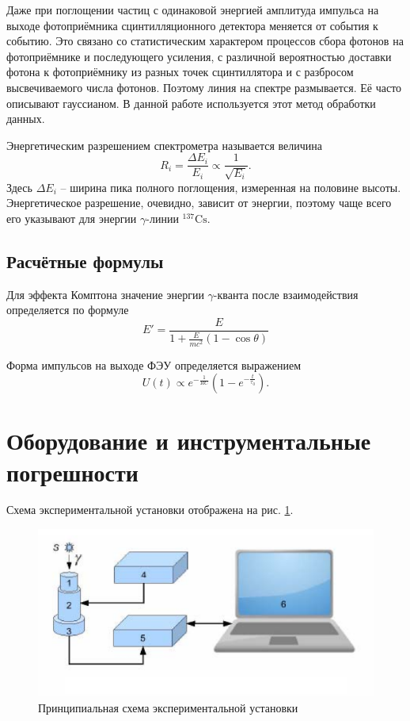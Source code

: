 \documentclass[a4paper]{article}
\newcommand{\isotope}[2]{$ ^{#2}\mathrm{#1} $}
\newcommand{\gmm}{$\gamma $}
\begin{document}
Даже при поглощении частиц с одинаковой энергией амплитуда импульса на выходе фотоприёмника сцинтилляционного детектора меняется от события к событию. Это связано со статистическим характером процессов сбора фотонов на фотоприёмнике и последующего усиления, с различной вероятностью доставки фотона к фотоприёмнику из разных точек сцинтиллятора и с разбросом высвечиваемого числа фотонов. Поэтому линия на спектре размывается. Её часто описывают гауссианом. В данной работе используется этот метод обработки данных. 

Энергетическим разрешением спектрометра называется величина
\begin{equation}
	R_i = \dfrac{\Delta E_i}{E_i} \propto \dfrac{1}{\sqrt{E_i}}.
\end{equation}
Здесь $ \Delta E_i $ -- ширина пика полного поглощения, измеренная на половине высоты. Энергетическое разрешение, очевидно, зависит от энергии, поэтому чаще всего его указывают для энергии \gmm-линии \isotope{Cs}{137}.

\subsection{Расчётные формулы}

Для эффекта Комптона значение энергии \gmm-кванта после взаимодействия определяется по формуле
\begin{equation*}\label{ы}
	E' = \frac{E}{1+\frac{E}{m c^2}\left( 1- \cos \theta\right) }
\end{equation*}

Форма импульсов на выходе ФЭУ определяется выражением
\begin{equation}\label{eq:2}
	U(t)\propto e^{-\frac{1}{R C}}\left( 1 - e^{-\frac{t}{\tau_0}}\right).
\end{equation}

\section{Оборудование и инструментальные погрешности}

Схема экспериментальной установки отображена на рис. \ref{fig:screenshot1}.
\begin{figure}
	\centering
	\includegraphics[width=0.7\linewidth]{Screenshot_1}
	\caption{Принципиальная схема экспериментальной установки}
	\label{fig:screenshot1}
\end{figure}
\end{document}
